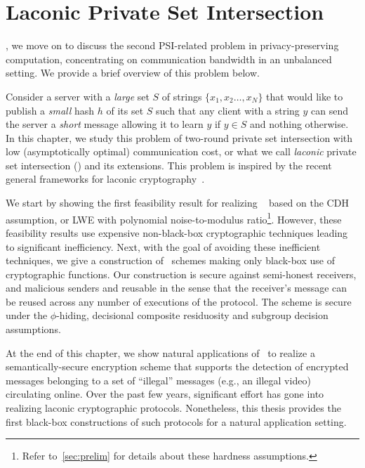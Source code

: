 
\chapter{Laconic Private Set Intersection}
\label{sec:laconicpsi}
, we move on to discuss the second PSI-related problem in privacy-preserving computation, concentrating on communication bandwidth in an unbalanced setting. We provide a brief overview of this problem below.

Consider a server with a \emph{large} set $S$
 of strings $\{x_1,x_2\ldots,x_N\}$ that would like to publish a \emph{small} hash $h$ of its set $S$ such that any client with a string $y$ can send the server a \emph{short} message allowing it to learn $y$ if $y \in S$ and nothing otherwise. In this chapter, we study this problem of two-round private set intersection with low (asymptotically optimal) communication cost, or what we call \emph{laconic} private set intersection (\ePSI) and its extensions. This problem is inspired by the recent general frameworks for laconic cryptography~\cite{C:CDGGMP17,FOCS:QuaWeeWic18}.

We start by showing the first feasibility result for realizing \ePSI~ based on the CDH assumption, or LWE with polynomial noise-to-modulus ratio\footnote{Refer to~\cref{sec:prelim} for details about these hardness assumptions.}. However, these feasibility results use expensive non-black-box cryptographic techniques leading to significant inefficiency. Next, with the goal of avoiding these inefficient techniques, we give a construction of \ePSI~schemes making only  black-box use of cryptographic functions. Our construction is secure against semi-honest receivers, and malicious senders and reusable in the sense that the receiver's message can be reused across any number of executions of the protocol. The scheme is secure under the $\phi$-hiding, decisional composite residuosity and subgroup decision assumptions. 

At the end of this chapter, we show natural applications of \ePSI~to realize a semantically-secure encryption scheme that supports the detection of encrypted messages belonging to a set of ``illegal'' messages (e.g., an illegal video) circulating online.
Over the past few years, significant effort has gone into realizing laconic cryptographic protocols. Nonetheless, this thesis provides the first black-box constructions of such protocols for a natural application setting.

